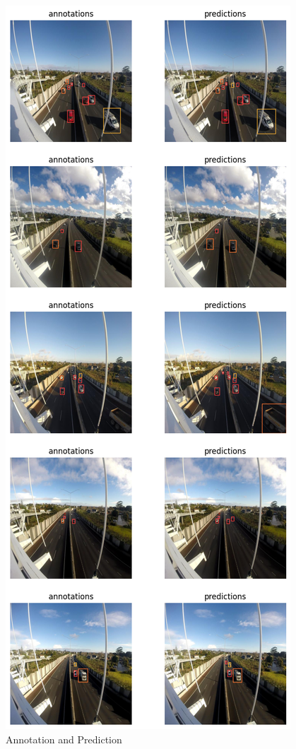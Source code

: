 \begin{figure}[H]
    \centering
    \includegraphics[width=0.6\linewidth]{tex/img/M-Annotation_&_Predictions.png}
    \caption{Annotation and Prediction}
    \label{fig:L-annot-pred}
\end{figure}

